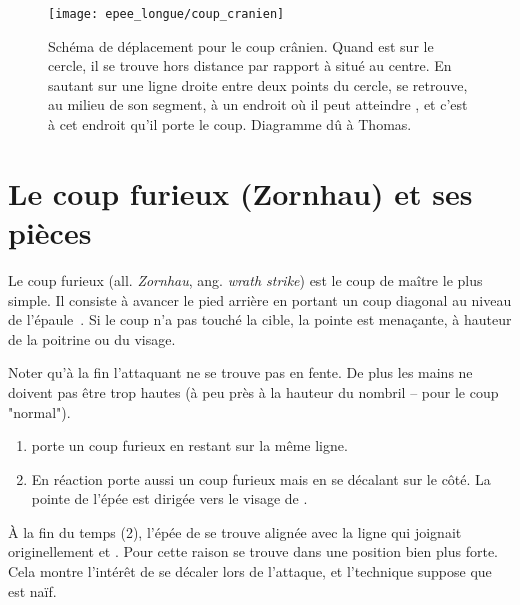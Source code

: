 \begin{figure}[ht]
	\centering
	\texttt{[image: epee\_longue/coup\_cranien]}
	\caption{Schéma de déplacement pour le coup crânien. Quand \A est sur le cercle, il se trouve hors distance par rapport à \D situé au centre. En sautant sur une ligne droite entre deux points du cercle, \A se retrouve, au milieu de son segment, à un endroit où il peut atteindre \D, et c'est à cet endroit qu'il porte le coup. Diagramme dû à Thomas.}
\end{figure}



\section{Le coup furieux (Zornhau) et ses pièces}



\begin{coup}

Le coup furieux (all. \emph{Zornhau}, ang. \emph{wrath strike}) est le coup de maître le plus simple.
Il consiste à avancer le pied arrière en portant un coup diagonal au niveau de l'épaule~\cite[fol.~19r-20v, p.~16]{Ringeck:Farrell:2014:CodexRingeck}.
Si le coup n'a pas touché la cible, la pointe est menaçante, à hauteur de la poitrine ou du visage.
\end{coup}


Noter qu'à la fin l'attaquant ne se trouve pas en fente.
De plus les mains ne doivent pas être trop hautes (à peu près à la hauteur du nombril – pour le coup "normal").


\begin{technique}

\begin{enumerate}
	\item \A porte un coup furieux en restant sur la même ligne.
	
	\item En réaction \D porte aussi un coup furieux mais en se décalant sur le côté.
	La pointe de l'épée est dirigée vers le visage de \A.
\end{enumerate}

À la fin du temps (2), l'épée de \D se trouve alignée avec la ligne qui joignait originellement \A et \D.
Pour cette raison \D se trouve dans une position bien plus forte.
Cela montre l'intérêt de se décaler lors de l'attaque, et l'technique suppose que \A est naïf.

\end{technique}



